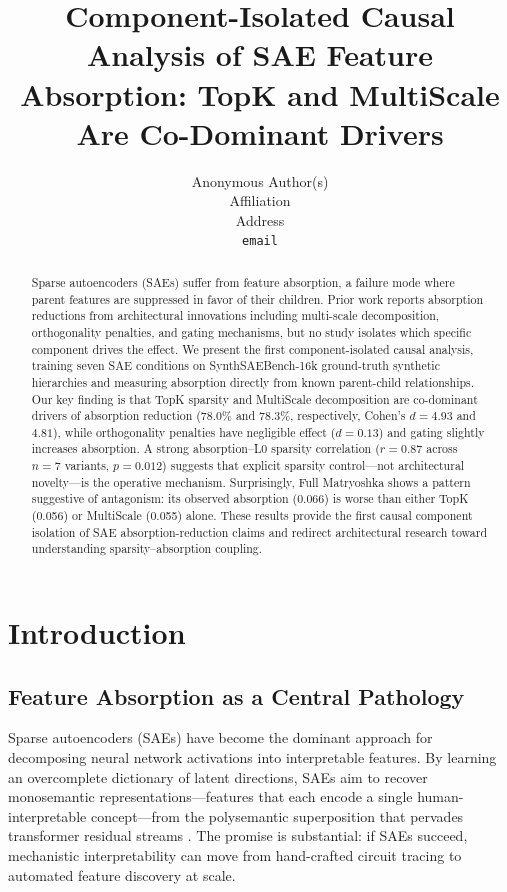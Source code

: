 \documentclass{article}
\title{Component-Isolated Causal Analysis of SAE Feature Absorption: TopK and MultiScale Are Co-Dominant Drivers}
\author{%
  Anonymous Author(s) \\
  Affiliation \\
  Address \\
  \texttt{email} \\
}
\begin{document}
\maketitle

\begin{abstract}
Sparse autoencoders (SAEs) suffer from feature absorption, a failure mode where parent features are suppressed in favor of their children. Prior work reports absorption reductions from architectural innovations including multi-scale decomposition, orthogonality penalties, and gating mechanisms, but no study isolates which specific component drives the effect. We present the first component-isolated causal analysis, training seven SAE conditions on SynthSAEBench-16k ground-truth synthetic hierarchies and measuring absorption directly from known parent-child relationships. Our key finding is that TopK sparsity and MultiScale decomposition are co-dominant drivers of absorption reduction (78.0\% and 78.3\%, respectively, Cohen's $d = 4.93$ and $4.81$), while orthogonality penalties have negligible effect ($d = 0.13$) and gating slightly increases absorption. A strong absorption--L0 sparsity correlation ($r = 0.87$ across $n = 7$ variants, $p = 0.012$) suggests that explicit sparsity control---not architectural novelty---is the operative mechanism. Surprisingly, Full Matryoshka shows a pattern suggestive of antagonism: its observed absorption (0.066) is worse than either TopK (0.056) or MultiScale (0.055) alone. These results provide the first causal component isolation of SAE absorption-reduction claims and redirect architectural research toward understanding sparsity--absorption coupling.
\end{abstract}

\section{Introduction}

\subsection{Feature Absorption as a Central Pathology}

Sparse autoencoders (SAEs) have become the dominant approach for decomposing neural network activations into interpretable features. By learning an overcomplete dictionary of latent directions, SAEs aim to recover monosemantic representations---features that each encode a single human-interpretable concept---from the polysemantic superposition that pervades transformer residual streams \citep{bricken2023monosemanticity,cunningham2023sparse}. The promise is substantial: if SAEs succeed, mechanistic interpretability can move from hand-crafted circuit tracing to automated feature discovery at scale.
\end{document}
